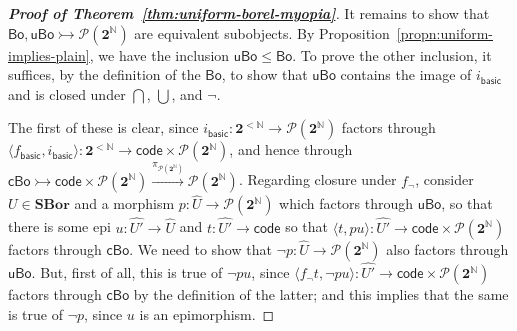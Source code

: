 \documentclass[11pt]{amsart}
\newcommand\basic{\mathsf{basic}}
\newcommand\Bo{\mathsf{Bo}}
\newcommand\br[1]{\langle{}#1\rangle{}}
\newcommand\cBo{\mathsf{cBo}}
\newcommand\code{\mathsf{code}}
\newcommand{\N}{\mathbb{N}}
\newcommand\pow{\mathcal{P}}
\newcommand\SBor{\mathbf{SBor}}
\newcommand\tox[2][]{\xrightarrow[#1]{#2}}
\newcommand\tto{\rightarrowtail}
\newcommand\two{\mathbf{2}}
\newcommand\uBo{\mathsf{uBo}}
\newcommand\wh[1]{\widehat{#1}}
\theoremstyle{definition}
\theoremstyle{remark}
\theoremstyle{plain}
\begin{document}
\begin{proof}[\textbf{\textup{Proof of Theorem~\ref{thm:uniform-borel-myopia}}}]
  It remains to show that \( \Bo, \uBo \tto \pow(\two^\N) \) are equivalent subobjects.
  By Proposition~\ref{propn:uniform-implies-plain}, we have the inclusion \( \uBo \le \Bo \).
  To prove the other inclusion, it suffices, by the definition of the \( \Bo \), to show that \( \uBo \) contains the image of \( i_\basic \) and is closed under \( \bigcap \), \( \bigcup \), and \( \neg \).

  The first of these is clear, since \( i_\basic \colon \two^{<\N} \to \pow(\two^\N) \) factors through \( \br{f_{\basic}, i_{\basic}} \colon \two^{<\N} \to \code \times \pow(\two^\N) \), and hence through \( \cBo \tto \code \times \pow(\two^\N) \tox{\pi_{\pow(\two^\N)}} \pow(\two^\N) \).
  Regarding closure under \( f_\neg \), consider \( U \in \SBor \) and a morphism \( p \colon \wh U \to \pow(\two^\N) \) which factors through \( \uBo \), so that there is some epi \( u \colon \wh{U'} \to \wh U \) and \( t \colon \wh{U'} \to \code \) so that \( \br{t, p u} \colon \wh{U'} \to \code \times \pow(\two^\N) \) factors through \( \cBo \).
  We need to show that \( \neg p \colon \wh U \to \pow(\two^\N) \) also factors through \( \uBo \).
  But, first of all, this is true of \( \neg p u \), since \( \br{f_\neg t, \neg p u} \colon \wh{U'} \to \code \times \pow(\two^\N) \) factors through \( \cBo \) by the definition of the latter; and this implies that the same is true of \( \neg p \), since \( u \) is an epimorphism.


\end{proof}
\end{document}
